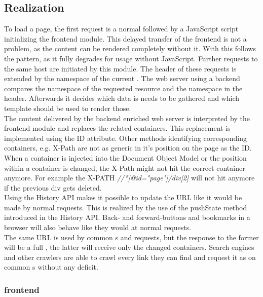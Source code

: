 \subsection{Realization\label{sec:lare_realization}}
To load a page, the first request is a normal \httpRequest{} followed by a JavaScript script initializing the \lare{} frontend module.
This delayed transfer of the frontend is not a problem, as the content can be rendered completely without it.
With this \lare{} follows the \hijax{} pattern, as it fully degrades for usage without JavaScript.
Further requests to the same host are initiated by this module.
The \http{} header of these requests is extended by the namespace of the current \webSite{}.
The web server using a \lare{} backend compares the namespace of the requested resource and the namespace in the \http{} header.
Afterwards it decides which data is needs to be gathered and which template should be used to render those.
\\
The content delivered by the \lare{} backend enriched web server is interpreted by the frontend module and replaces the related containers.
This replacement is implemented using the ID attribute.
Other methods identifying corresponding containers, e.g. X-Path are not as generic in it's position on the page as the ID.
When a container is injected into the Document Object Model or the position within a container is changed, the X-Path might not hit the correct container anymore.
For example the X-PATH \emph{//*[@id="page"]/div[2]} will not hit anymore if the previous div gets deleted.
\\
Using the History API makes it possible to update the URL like it would be made by normal requests.
This is realized by the use of the pushState method introduced in the History API.
Back- and forward-buttons and bookmarks in a browser will also behave like they would at normal requests.
\\
The same URL is used by common \httpRequest{}s and \lare{} requests, but the response to the former will be a full \webPage{}, the latter will receive only the changed containers.
Search engines and other crawlers are able to crawl every link they can find and request it as on common \webPage{}s without any deficit.

\subsubsection{\lare{} frontend\label{sec:lare_frontend}}

